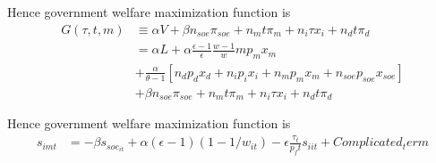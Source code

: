 \documentclass[xcolor=dvipsnames]{beamer}
\begin{document}
\begin{frame}
Hence government welfare maximization function is
\begin{equation}
\begin{split}
G(\tau,t,m)&\equiv\alpha V+\beta n_{soe} \pi_{soe}+ n_mt\pi_m+n_i\tau x_i+n_dt\pi_d\\
&=\alpha L + \alpha \frac{\epsilon-1}{\epsilon}\frac{w-1}{w}mp_mx_m\\
&+ \frac{\alpha}{\theta-1}[n_dp_dx_d+n_ip_ix_i+n_mp_mx_m+n_{soe}p_{soe}x_{soe}]\\
&+\beta n_{soe} \pi_{soe}+ n_mt\pi_m+n_i\tau x_i+n_dt\pi_d
\end{split}
\end{equation}
\end{frame}

\begin{frame}
	Hence government welfare maximization function is
	\begin{equation}
	\begin{split}
	s_{imt}&=-\beta s_{soe_{it}}+\alpha(\epsilon-1)(1-1/w_{it})-\epsilon\frac{\tau_t}{p_ft}s_{iit}+Complicated_term
	\end{split}
	\end{equation}
\end{frame}
\end{document}
